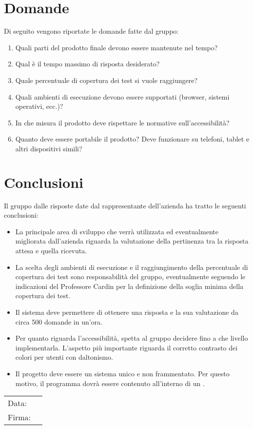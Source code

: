 \documentclass[a4paper, 12pt]{article}
\begin{document}
\newpage

\section{Domande}
\label{sec:Domande}
Di seguito vengono riportate le domande fatte dal gruppo:
\begin{enumerate}
    \item Quali parti del prodotto finale devono essere mantenute nel tempo?
    \item Qual è il tempo massimo di risposta desiderato?
    \item Quale percentuale di copertura dei test si vuole raggiungere?
    \item Quali ambienti di esecuzione devono essere supportati (browser, sistemi operativi, ecc.)?
    \item In che misura il prodotto deve rispettare le normative sull’accessibilità?
    \item Quanto deve essere portabile il prodotto? Deve funzionare su telefoni, tablet e altri dispositivi simili?
\end{enumerate}
\section{Conclusioni}
\label{sec:Conclusioni}
Il gruppo dalle risposte date dal rappresentante dell’azienda ha tratto le seguenti conclusioni:
\begin{itemize}
    \item La principale area di sviluppo che verrà utilizzata ed eventualmente migliorata dall'azienda riguarda la valutazione della pertinenza tra la risposta attesa e quella ricevuta.
    \item La scelta degli ambienti di esecuzione e il raggiungimento della percentuale di copertura dei test sono responsabilità del gruppo, eventualmente seguendo le indicazioni del Professore Cardin per la definizione della soglia minima della copertura dei test. 
    \item Il sistema deve permettere di ottenere una risposta e la sua valutazione da circa 500 domande in un'ora. 
    \item Per quanto riguarda l’accessibilità, spetta al gruppo decidere fino a che livello implementarla. L'aspetto più importante riguarda il corretto contrasto dei colori per utenti con daltonismo.
    \item Il progetto deve essere un sistema unico e non frammentato. Per questo motivo, il programma dovrà essere contenuto all’interno di un .  
\end{itemize}
\vfill
{\renewcommand{\arraystretch}{2}
\begin{tabular}{l p{5cm}}
    Data: &  \hrulefill \\
    Firma: & \hrulefill \\
\end{tabular}
}
\end{document}
